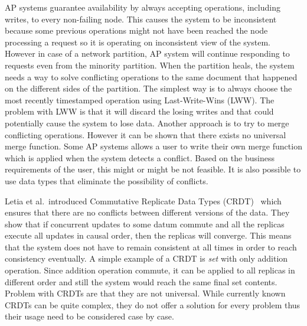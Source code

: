 AP systems guarantee availability by always accepting operations, including
writes, to every non-failing node. This causes the system to be inconsistent
because some previous operations might not have been reached the node
processing a request so it is operating on inconsistent view of the system.
However in case of a network partition, AP system will continue responding to
requests even from the minority partition. When the partition heals, the system
needs a way to solve conflicting operations to the same document that happened
on the different sides of the partition. The simplest way is to always choose the most recently timestamped
operation using Last-Write-Wins (LWW). The problem with LWW is that it will
discard the losing writes and that could potentially cause the system to lose
data.  Another approach is to try to merge conflicting operations. However it
can be shown that there exists no universal merge function. Some AP systems allows a user to write their own merge function which
is applied when the system detects a conflict.  Based on the business
requirements of the user, this might or might be not feasible. It is also
possible to use data types that eliminate the possibility of conflicts.

Letia et al.\ introduced Commutative Replicate Data Types
(CRDT)~\cite{letia2009crdts} which ensures that there are no conflicts between
different versions of the data. They show that if concurrent updates to some
datum commute and all the replicas execute all updates in causal order, then the
replicas will converge. This means that the system does not have to remain
consistent at all times in order to reach consistency eventually. A simple
example of a CRDT is \emph{set} with only addition operation. Since addition
operation commute, it can be applied to all replicas in different order and
still the system would reach the same final set contents. Problem with CRDTs
are that they are not universal. While currently known CRDTs can be quite
complex, they do not offer a solution for every problem thus their usage need
to be considered case by case.
